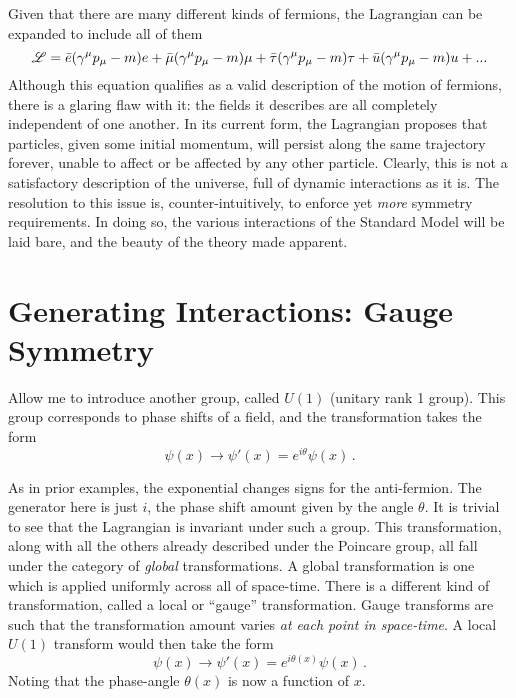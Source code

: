     Given that there are many different kinds of fermions, the Lagrangian can be expanded to include all of them
    \begin{equation}
        \mathscr{L} = \bar{e} (\gamma^\mu p_\mu - m) e
        + \bar{\mu} (\gamma^\mu p_\mu - m) \mu
        + \bar{\tau} (\gamma^\mu p_\mu - m) \tau
        + \bar{u} (\gamma^\mu p_\mu - m) u
        + ...
    \end{equation}
    Although this equation qualifies as a valid description of the motion of fermions,
        there is a glaring flaw with it: the fields it describes are all completely independent of one another.
    In its current form, the Lagrangian proposes that particles, given some initial momentum,
        will persist along the same trajectory forever, unable to affect or be affected by any other particle.
    Clearly, this is not a satisfactory description of the universe, full of dynamic interactions as it is.
    The resolution to this issue is, counter-intuitively, to enforce yet \textit{more} symmetry requirements.
    In doing so, the various interactions of the Standard Model will be laid bare,
        and the beauty of the theory made apparent.



\section{Generating Interactions: Gauge Symmetry} \label{sec:gauge_symmetry}

    Allow me to introduce another group, called $U(1)$ (unitary rank 1 group).
    This group corresponds to phase shifts of a field, and the transformation takes the form
    \begin{equation}
        \psi(x) \to \psi'(x) = e^{i\theta} \psi(x)
        \,.
    \end{equation}

    As in prior examples, the exponential changes signs for the anti-fermion.
    The generator here is just $i$, the phase shift amount given by the angle $\theta$.
    It is trivial to see that the Lagrangian is invariant under such a group.
    This transformation, along with all the others already described under the Poincare group,
        all fall under the category of \textit{global} transformations.
    A global transformation is one which is applied uniformly across all of space-time.
    There is a different kind of transformation, called a local or ``gauge'' transformation.
    Gauge transforms are such that the transformation amount varies \textit{at each point in space-time}.
    A local $U(1)$ transform would then take the form 
    \begin{equation}
        \psi(x) \to \psi'(x) = e^{i\theta(x)} \psi(x)
        \,.
    \end{equation}
    Noting that the phase-angle $\theta(x)$ is now a function of $x$.

